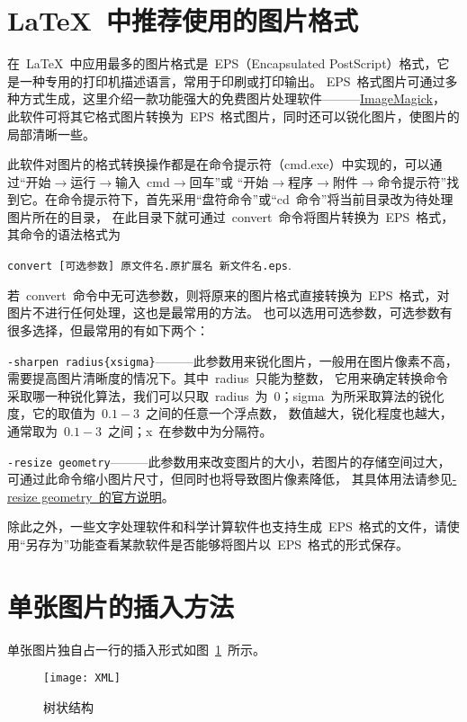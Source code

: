 \section{\LaTeX~中推荐使用的图片格式}
在~\LaTeX~中应用最多的图片格式是~EPS（Encapsulated PostScript）格式，它是一种专用的打印机描述语言，常用于印刷或打印输出。
EPS~格式图片可通过多种方式生成，这里介绍一款功能强大的免费图片处理软件———\href{http://www.imagemagick.org/}{ImageMagick}，
此软件可将其它格式图片转换为~EPS~格式图片，同时还可以锐化图片，使图片的局部清晰一些。

此软件对图片的格式转换操作都是在命令提示符（cmd.exe）中实现的，可以通过“开始$\to$运行$\to$输入~cmd$\to$回车”或
“开始$\to$程序$\to$附件$\to$命令提示符”找到它。在命令提示符下，首先采用“盘符命令”或“cd~命令”将当前目录改为待处理图片所在的目录，
在此目录下就可通过~convert~命令将图片转换为~EPS~格式，其命令的语法格式为

\indent\verb|convert [可选参数] 原文件名.原扩展名 新文件名.eps|.

若~convert~命令中无可选参数，则将原来的图片格式直接转换为~EPS~格式，对图片不进行任何处理，这也是最常用的方法。
也可以选用可选参数，可选参数有很多选择，但最常用的有如下两个：

\verb|-sharpen radius{xsigma}|———此参数用来锐化图片，一般用在图片像素不高，需要提高图片清晰度的情况下。其中~radius~只能为整数，
它用来确定转换命令采取哪一种锐化算法，我们可以只取~radius~为~0；sigma~为所采取算法的锐化度，它的取值为~$0.1 - 3$~之间的任意一个浮点数，
数值越大，锐化程度也越大，通常取为~$0.1 - 3$~之间；x~在参数中为分隔符。

\verb|-resize geometry|———此参数用来改变图片的大小，若图片的存储空间过大，可通过此命令缩小图片尺寸，但同时也将导致图片像素降低，
其具体用法请参见\href{http://www.imagemagick.org/script/command-line-options.php#resize}{-resize geometry~的官方说明}。

除此之外，一些文字处理软件和科学计算软件也支持生成~EPS~格式的文件，请使用“另存为”功能查看某款软件是否能够将图片以~EPS~格式的形式保存。

\section{单张图片的插入方法}
单张图片独自占一行的插入形式如图~\ref{fig:xml}~所示。
\begin{figure}[htbp]
\centering
\texttt{[image: XML]}
\caption{树状结构}\label{fig:xml}
\vspace{\baselineskip}
\end{figure}


